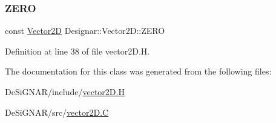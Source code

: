 \subsubsection{\texorpdfstring{Z\+E\+RO}{ZERO}}
{\footnotesize\ttfamily const \hyperlink{class_designar_1_1_vector2_d}{Vector2D} Designar\+::\+Vector2\+D\+::\+Z\+E\+RO\hspace{0.3cm}{\ttfamily [static]}}



Definition at line 38 of file vector2\+D.\+H.



The documentation for this class was generated from the following files\+:\begin{DoxyCompactItemize}
\item 
De\+Si\+G\+N\+A\+R/include/\hyperlink{vector2_d_8_h}{vector2\+D.\+H}\item 
De\+Si\+G\+N\+A\+R/src/\hyperlink{vector2_d_8_c}{vector2\+D.\+C}\end{DoxyCompactItemize}
